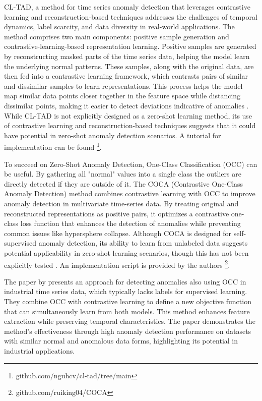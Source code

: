 CL-TAD, a method for time series anomaly detection that leverages contrastive learning and reconstruction-based techniques addresses the challenges of temporal dynamics, label scarcity, and data diversity in real-world applications. The method comprises two main components: positive sample generation and contrastive-learning-based representation learning. Positive samples are generated by reconstructing masked parts of the time series data, helping the model learn the underlying normal patterns. These samples, along with the original data, are then fed into a contrastive learning framework, which contrasts pairs of similar and dissimilar samples to learn representations. This process helps the model map similar data points closer together in the feature space while distancing dissimilar points, making it easier to detect deviations indicative of anomalies \cite{ngu_cl-tad_2023}.
While CL-TAD is not explicitly designed as a zero-shot learning method, its use of contrastive learning and reconstruction-based techniques suggests that it could have potential in zero-shot anomaly detection scenarios. A tutorial for implementation can be found \footnote{\fussy\tiny github.com/nguhcv/cl-tad/tree/main}.

To succeed on Zero-Shot Anomaly Detection, One-Class Classification (OCC) can be useful.
By gathering all "normal" values into a single class the outliers are directly detected if they are outside of it.
The COCA (Contrastive One-Class Anomaly Detection) method combines contrastive learning with OCC to improve anomaly detection in multivariate time-series data. By treating original and reconstructed representations as positive pairs, it optimizes a contrastive one-class loss function that enhances the detection of anomalies while preventing common issues like hypersphere collapse. Although COCA is designed for self-supervised anomaly detection, its ability to learn from unlabeled data suggests potential applicability in zero-shot learning scenarios, though this has not been explicitly tested \cite{wang_deep_2023}. An implementation script is provided by the authors \footnote{\fussy\tiny github.com/ruiking04/COCA}.

%
The paper by \cite{lee_time_2023} presents an approach for detecting anomalies also using OCC in industrial time series data, which typically lacks labels for supervised learning. They combine OCC with contrastive learning to define a new objective function that can simultaneously learn from both models. This method enhances feature extraction while preserving temporal characteristics. The paper demonstrates the method's effectiveness through high anomaly detection performance on datasets with similar normal and anomalous data forms, highlighting its potential in industrial applications.

